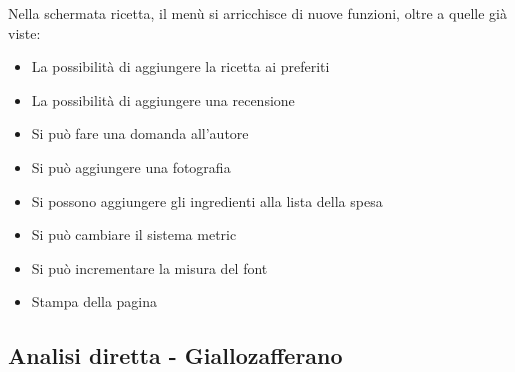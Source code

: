 Nella schermata ricetta, il menù si arricchisce di nuove funzioni, oltre a quelle già viste:
\begin{itemize}
\item La possibilità di aggiungere la ricetta ai preferiti
\item La possibilità di aggiungere una recensione
\item Si può fare una domanda all'autore
\item Si può aggiungere una fotografia
\item Si possono aggiungere gli ingredienti alla lista della spesa
\item Si può cambiare il sistema metric
\item Si può incrementare la misura del font
\item Stampa della pagina
\end{itemize}


\subsection*{Analisi diretta - Giallozafferano}

